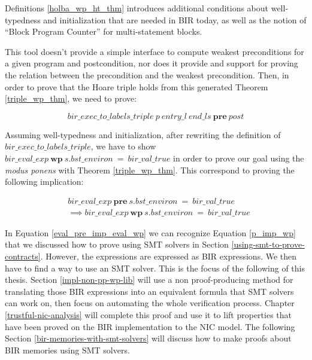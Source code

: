 \documentclass{kththesis}
\begin{document}
Definitions \ref{holba_wp_ht_thm} introduces additional conditions about well-typedness and initialization that are needed in BIR today\footnotemark, as well as the notion of ``Block Program Counter'' for multi-statement blocks. %


This tool doesn't provide a simple interface to compute weakest preconditions for a given program and postcondition, nor does it provide and support for proving the relation between the precondition and the weakest precondition. Then, in order to prove that the Hoare triple holds from this generated Theorem \ref{triple_wp_thm}, we need to prove:

\begin{equation} 
    bir\_exec\_to\_labels\_triple~p~entry\_l~end\_ls~\mathbf{pre}~post
    \label{triple_pre_thm}
\end{equation}

Assuming well-typedness and initialization, after rewriting the definition of $bir\_exec\_to\_labels\_triple$, we have to show $bir\_eval\_exp~\mathbf{wp}~s.bst\_environ~=~bir\_val\_true$ in order to prove our goal using the \textit{modus ponens} with Theorem \ref{triple_wp_thm}. This correspond to proving the following implication:

\begin{small}
    \begin{equation}
        \begin{split}
            &bir\_eval\_exp~\mathbf{pre}~s.bst\_environ~=~bir\_val\_true\\
            &\implies bir\_eval\_exp~\mathbf{wp}~s.bst\_environ~=~bir\_val\_true
        \end{split}
        \label{eval_pre_imp_eval_wp}
    \end{equation}
\end{small}

In Equation \ref{eval_pre_imp_eval_wp} we can recognize Equation \ref{p_imp_wp} that we discussed how to prove using \gls{SMT} solvers in Section \ref{using-smt-to-prove-contracts}. However, the expressions are expressed as BIR expressions. We then have to find a way to use an SMT solver. This is the focus of the following of this thesis. Section \ref{impl-non-pp-wp-lib} will use a non \gls{proof-producing} method for translating those BIR expressions into an equivalent formula that SMT solvers can work on, then focus on automating the whole verification process. Chapter \ref{trustful-nic-analysis} will complete this proof and use it to lift properties that have been proved on the BIR implementation to the \gls{NIC} model. The following Section \ref{bir-memories-with-smt-solvers} will discuss how to make proofs about BIR memories using \gls{SMT} solvers.
\end{document}
